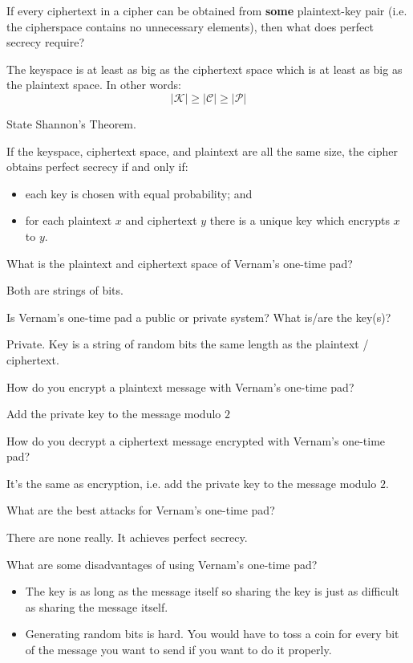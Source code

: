 \documentclass{article}
\newcounter{qcounter}
\newcommand{\showqcounter}{\theqcounter}
\newcommand{\question}{\vspace{5mm}\addtocounter{qcounter}{1}\vspace{5mm}{\bf Q\showqcounter: }}
\newcommand{\answer}{\vspace{5mm}{\bf A\showqcounter: }}
\begin{document}
\question If every ciphertext in a cipher can be obtained from {\bf some} plaintext-key pair (i.e. the cipherspace contains no unnecessary 
  elements), then what does perfect secrecy require?

\answer The keyspace is at least as big as the ciphertext space which is at least as big as the plaintext space. In other words:
  $$
    \vert \mathcal{K} \vert \geq \vert \mathcal{C} \vert \geq \vert \mathcal{P} \vert
  $$


\question State Shannon's Theorem.

\answer If the keyspace, ciphertext space, and plaintext are all the same size, the cipher obtains perfect secrecy if and only if:
  \begin{itemize}
    \item each key is chosen with equal probability; and
    \item for each plaintext $x$ and ciphertext $y$ there is a unique key which encrypts $x$ to $y$.
  \end{itemize}


\question What is the plaintext and ciphertext space of Vernam's one-time pad?

\answer Both are strings of bits.


\question Is Vernam's one-time pad a public or private system? What is/are the key(s)?

\answer Private. Key is a string of random bits the same length as the plaintext / ciphertext.


\question How do you encrypt a plaintext message with Vernam's one-time pad?

\answer Add the private key to the message modulo $2$


\question How do you decrypt a ciphertext message encrypted with Vernam's one-time pad?

\answer It's the same as encryption, i.e. add the private key to the message modulo $2$.


\question What are the best attacks for Vernam's one-time pad?

\answer There are none really. It achieves perfect secrecy.


\question What are some disadvantages of using Vernam's one-time pad?

\answer 
  \begin{itemize}
    \item The key is as long as the message itself so sharing the key is just as difficult as sharing the message itself.
    \item Generating random bits is hard. You would have to toss a coin for every bit of the message you want to send if you want to do it properly.
  \end{itemize}


\question

\answer


\question

\answer
\end{document}
